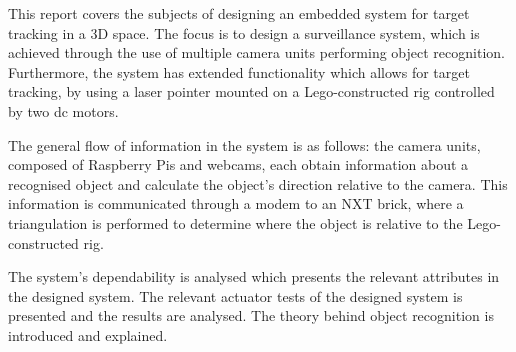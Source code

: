 This report covers the subjects of designing an embedded system for target tracking in a 3D space. The focus is to design a surveillance system, which is achieved through the use of multiple camera units performing object recognition. Furthermore, the system has extended functionality which allows for target tracking, by using a laser pointer mounted on a Lego-constructed rig controlled by two dc motors.

The general flow of information in the system is as follows: the camera units, composed of Raspberry Pis and webcams, each obtain information about a recognised object and calculate the object's direction relative to the camera. This information is communicated through a modem to an NXT brick, where a triangulation is performed to determine where the object is relative to the Lego-constructed rig. 

The system's dependability is analysed which presents the relevant attributes in the designed system. The relevant actuator tests of the designed system is presented and the results are analysed. The theory behind object recognition is introduced and explained.